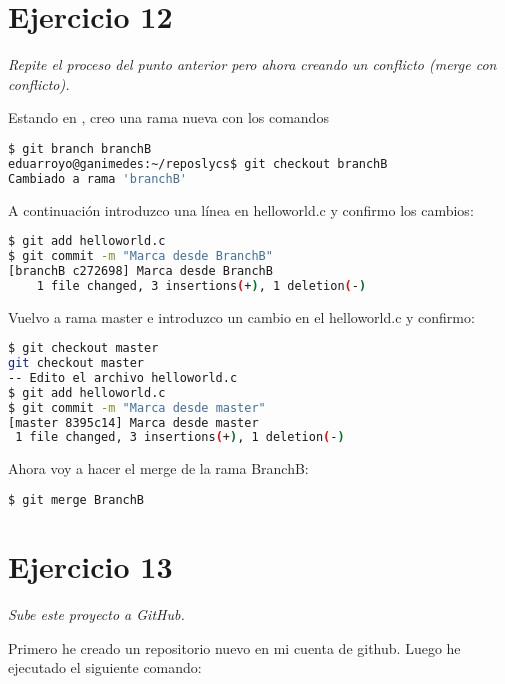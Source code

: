 \section{Ejercicio 12}
\begin{center}
    \parbox{12cm}{\justify\textit{
        Repite el proceso del punto anterior pero ahora creando un conflicto (merge con conflicto).
    }}
\end{center}
Estando en , creo una rama nueva con los comandos
\begin{lstlisting}[xleftmargin=.16\textwidth,language=bash]
$ git branch branchB
eduarroyo@ganimedes:~/reposlycs$ git checkout branchB
Cambiado a rama 'branchB'
\end{lstlisting}
A continuación introduzco una línea en helloworld.c y confirmo los cambios:

\begin{lstlisting}[xleftmargin=.16\textwidth,language=bash]
$ git add helloworld.c 
$ git commit -m "Marca desde BranchB"
[branchB c272698] Marca desde BranchB
    1 file changed, 3 insertions(+), 1 deletion(-)
\end{lstlisting}

Vuelvo a rama master e introduzco un cambio en el helloworld.c y confirmo:
\begin{lstlisting}[xleftmargin=.16\textwidth,language=bash]
$ git checkout master
git checkout master
-- Edito el archivo helloworld.c
$ git add helloworld.c
$ git commit -m "Marca desde master"
[master 8395c14] Marca desde master
 1 file changed, 3 insertions(+), 1 deletion(-)
\end{lstlisting}

Ahora voy a hacer el merge de la rama BranchB:
\begin{lstlisting}[xleftmargin=.16\textwidth,language=bash]
$ git merge BranchB
\end{lstlisting}

\section{Ejercicio 13}
\begin{center}
    \parbox{12cm}{\justify\textit{
        Sube este proyecto a GitHub.
    }}
\end{center}
Primero he creado un repositorio nuevo en mi cuenta de github. Luego he ejecutado el siguiente comando:

